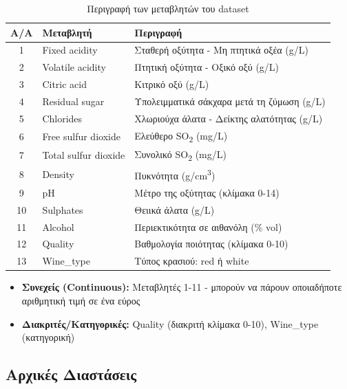\documentclass[12pt,a4paper]{article}
\begin{document}
\begin{table}[H]
\centering
\caption{\textgreek{Περιγραφή των μεταβλητών του dataset}}
\label{tab:variables}
\begin{tabular}{@{}clp{7cm}@{}}
\toprule
\textbf{A/A} & \textbf{\textgreek{Μεταβλητή}} & \textbf{\textgreek{Περιγραφή}} \\
\midrule
1 & Fixed acidity & \textgreek{Σταθερή οξύτητα - Μη πτητικά οξέα (g/L)} \\
2 & Volatile acidity & \textgreek{Πτητική οξύτητα - Οξικό οξύ (g/L)} \\
3 & Citric acid & \textgreek{Κιτρικό οξύ (g/L)} \\
4 & Residual sugar & \textgreek{Υπολειμματικά σάκχαρα μετά τη ζύμωση (g/L)} \\
5 & Chlorides & \textgreek{Χλωριούχα άλατα - Δείκτης αλατότητας (g/L)} \\
6 & Free sulfur dioxide & \textgreek{Ελεύθερο SO\textsubscript{2} (mg/L)} \\
7 & Total sulfur dioxide & \textgreek{Συνολικό SO\textsubscript{2} (mg/L)} \\
8 & Density & \textgreek{Πυκνότητα (g/cm\textsuperscript{3})} \\
9 & pH & \textgreek{Μέτρο της οξύτητας (κλίμακα 0-14)} \\
10 & Sulphates & \textgreek{Θειικά άλατα (g/L)} \\
11 & Alcohol & \textgreek{Περιεκτικότητα σε αιθανόλη (\% vol)} \\
12 & Quality & \textgreek{Βαθμολογία ποιότητας (κλίμακα 0-10)} \\
13 & Wine\_type & \textgreek{Τύπος κρασιού: red ή white} \\
\bottomrule
\end{tabular}
\end{table}

\begin{infobox}
\begin{itemize}
    \item \textbf{\textgreek{Συνεχείς (Continuous):}} \textgreek{Μεταβλητές 1-11 - μπορούν να πάρουν οποιαδήποτε αριθμητική τιμή σε ένα εύρος}
    \item \textbf{\textgreek{Διακριτές/Κατηγορικές:}} \textgreek{Quality (διακριτή κλίμακα 0-10), Wine\_type (κατηγορική)}
\end{itemize}
\end{infobox}

\subsection{\textgreek{Αρχικές Διαστάσεις}}
\end{document}
